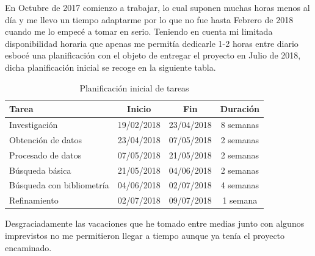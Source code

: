 En Octubre de 2017 comienzo a trabajar, lo cual suponen muchas horas menos al día y me llevo un tiempo adaptarme por lo que no fue hasta Febrero de 2018 cuando me lo empecé a tomar en serio. Teniendo en cuenta mi limitada disponibilidad horaria que apenas me permitía dedicarle 1-2 horas entre diario esbocé una planificación con el objeto de entregar el proyecto en Julio de 2018, dicha planificación inicial se recoge en la siguiente tabla.

\begin{table} [h!]
	\centering
	\begin{tabular}{l c c c}
		\hline
		\textbf{Tarea}            & \textbf{Inicio} & \textbf{Fin} & \textbf{Duración} \\ \hline\hline
		Investigación             & 19/02/2018      & 23/04/2018   & 8 semanas         \\ \hline
		Obtención de datos        & 23/04/2018      & 07/05/2018   & 2 semanas         \\ \hline
		Procesado de datos        & 07/05/2018      & 21/05/2018   & 2 semanas         \\ \hline
		Búsqueda básica           & 21/05/2018      & 04/06/2018   & 2 semanas         \\ \hline
		Búsqueda con bibliometría & 04/06/2018      & 02/07/2018   & 4 semanas         \\ \hline
		Refinamiento              & 02/07/2018      & 09/07/2018   & 1 semana          \\ \hline
	\end{tabular}
	\caption{Planificación inicial de tareas}
\end{table}

Desgraciadamente las vacaciones que he tomado entre medias junto con algunos imprevistos no me permitieron llegar a tiempo aunque ya tenía el proyecto encaminado.
